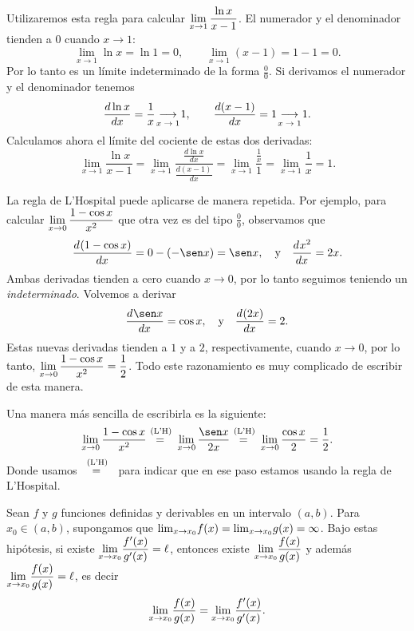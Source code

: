 \begin{example}
    Utilizaremos esta regla para calcular $\displaystyle\lim_{x\to 1} \frac{\ln x}{x-1}$.
    El numerador y el denominador tienden a $0$ cuando $x\to1$:
    \[
        \lim_{x\to 1} \ln x = \ln 1 = 0,
        \qquad
        \lim_{x\to 1} (x-1) = 1-1=0.
    \]
    Por lo tanto es un límite indeterminado de la forma $\frac00$. Si derivamos el numerador y el denominador tenemos
    \[
    \frac{d \ln x}{dx} = \frac1x\tox{1}1, \qquad \frac{d(x-1)}{dx}=1\tox{1}1.
    \]
    Calculamos ahora el límite del cociente de estas dos derivadas:
    \[
        \lim_{x\to 1} \frac{\ln x}{x-1}= \lim_{x\to 1} \frac{\frac{d \ln x}{dx}}{\frac{d(x-1)}{dx}}
    =\lim_{x\to 1} \frac{\frac1x}{1}=\lim_{x\to 1} \frac1x=1.
    \]
\end{example}

\begin{example}
    La regla de L'Hospital puede aplicarse de manera repetida. Por ejemplo, para calcular $\displaystyle\lim_{x\to 0}\frac{1-\cos x}{x^2}$ que otra vez es del tipo $\frac00$, observamos que 
    \[
    \dd[]{(1-\cos x)}{x}=0-(-\sen x)=\sen x,
    \quad\text{y}\quad
    \dd[]{x^2}{x}=2x.
    \]
    Ambas derivadas tienden a cero cuando $x\to 0$, por lo tanto seguimos teniendo un \emph{indeterminado}. Volvemos a derivar
    \[
        \dd[]{\sen x}{x}=\cos x,
        \quad\text{y}\quad
        \dd[]{(2x)}{x}=2.
    \]
    Estas nuevas derivadas tienden a $1$ y a $2$, respectivamente, cuando $x\to 0$, por lo tanto, $\displaystyle\lim_{x\to 0}\frac{1-\cos x}{x^2}=\frac12$. Todo este razonamiento es muy complicado de escribir de esta manera.
    
    Una manera más sencilla de escribirla es la siguiente:
    \[
        \lim_{x\to 0}\frac{1-\cos x}{x^2}
        \eqLH \lim_{x\to 0}\frac{\sen x}{2x}
        \eqLH \lim_{x\to 0}\frac{\cos x}{2} = \frac12.
    \]
    Donde usamos \,$\eqLH$\, para indicar que en ese paso estamos usando la regla de L'Hospital.
\end{example}


\begin{proposition}
    Sean $f$ y $g$ funciones definidas y derivables en un intervalo $(a,b)$.
    Para $x_0\in(a,b)$, supongamos que ${\lim_{x\to x_0}} f(x)={\lim_{x\to x_0}} g(x)=\infty$.
    Bajo estas hipótesis, si existe $\displaystyle{\ensuremath{\lim_{x\to x_0}}} \frac{f'(x)}{g'(x)}=\ell$, entonces existe $\displaystyle{\ensuremath{\lim_{x\to x_0}}} \frac{f(x)}{g(x)}$ y además $\displaystyle{\ensuremath{\lim_{x\to x_0}}} \frac{f(x)}{g(x)}=\ell$, es decir
    \[
        {\lim_{x\to x_0}} \frac{f(x)}{g(x)}={\lim_{x\to x_0}} \frac{f'(x)}{g'(x)}.
    \]
\end{proposition}

